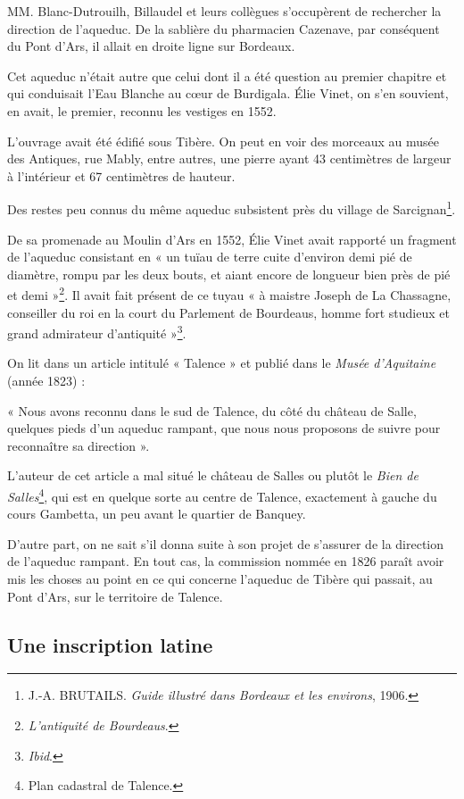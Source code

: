 \documentclass[a4paper,11pt]{book}
\begin{document}
MM. Blanc-Dutrouilh, Billaudel et leurs collègues s'occupèrent de rechercher la direction de l'aqueduc. De la sablière du pharmacien Cazenave, par conséquent du Pont d'Ars, il allait en droite ligne sur Bordeaux.

Cet aqueduc n'était autre que celui dont il a été question au premier chapitre et qui conduisait l'Eau Blanche au cœur de Burdigala. Élie Vinet, on s'en souvient, en avait, le premier, reconnu les vestiges en 1552.

L'ouvrage avait été édifié sous Tibère. On peut en voir des morceaux au musée des Antiques, rue Mably, entre autres, une pierre ayant 43 centimètres de largeur à l'intérieur et 67 centimètres de hauteur.

Des restes peu connus du même aqueduc subsistent près du village de Sarcignan\footnote{J.-A. \textsc{BRUTAILS}. \textit{Guide illustré dans Bordeaux et les environs}, 1906.}.

De sa promenade au Moulin d'Ars en 1552, Élie Vinet avait rapporté un fragment de l'aqueduc consistant en « un tuïau de terre cuite d'environ demi pié de diamètre, rompu par les deux bouts, et aiant encore de longueur bien près de pié et demi »\footnote{\textit{L'antiquité de Bourdeaus}.}. Il avait fait présent de ce tuyau « à maistre Joseph de La Chassagne, conseiller du roi en la court du Parlement de Bourdeaus, homme fort studieux et grand admirateur d'antiquité »\footnote{\textit{Ibid}.}.

On lit dans un article intitulé « Talence » et publié dans le \textit{Musée d'Aquitaine} (année 1823) :

« Nous avons reconnu dans le sud de Talence, du côté du château de Salle, quelques pieds d'un aqueduc rampant, que nous nous proposons de suivre pour reconnaître sa direction ».

L'auteur de cet article a mal situé le château de Salles ou plutôt le \textit{Bien de Salles}\footnote{Plan cadastral de Talence.}, qui est en quelque sorte au centre de Talence, exactement à gauche du cours Gambetta, un peu avant le quartier de Banquey.

D'autre part, on ne sait s'il donna suite à son projet de s'assurer de la direction de l'aqueduc rampant. En tout cas, la commission nommée en 1826 paraît avoir mis les choses au point en ce qui concerne l'aqueduc de Tibère qui passait, au Pont d'Ars, sur le territoire de Talence.

\subsection{Une inscription latine}
\end{document}
